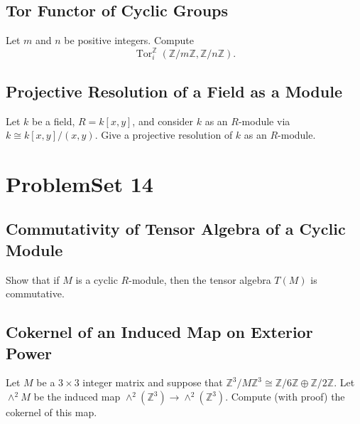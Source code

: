 \documentclass[lang=cn,11pt]{template}
\begin{document}
\section{Tor Functor of Cyclic Groups}
Let \( m \) and \( n \) be positive integers. Compute
\[
\operatorname{Tor}^\mathbb{Z}_i(\mathbb{Z}/m\mathbb{Z}, \mathbb{Z}/n\mathbb{Z}).
\]

\section{Projective Resolution of a Field as a Module}
Let \( k \) be a field, \( R = k[x, y] \), and consider \( k \) as an \( R \)-module via \( k \cong k[x, y]/(x, y) \). Give a projective resolution of \( k \) as an \( R \)-module.







\chapter{ProblemSet 14}

\section{Commutativity of Tensor Algebra of a Cyclic Module}
Show that if \( M \) is a cyclic \( R \)-module, then the tensor algebra \( T(M) \) is commutative.

\section{Cokernel of an Induced Map on Exterior Power}
Let \( M \) be a \( 3 \times 3 \) integer matrix and suppose that \( \mathbb{Z}^3 / M\mathbb{Z}^3 \cong \mathbb{Z}/6\mathbb{Z} \oplus \mathbb{Z}/2\mathbb{Z} \). Let \( \wedge^2 M \) be the induced map \( \wedge^2(\mathbb{Z}^3) \rightarrow \wedge^2(\mathbb{Z}^3) \). Compute (with proof) the cokernel of this map.
\end{document}
